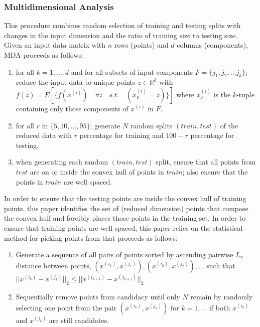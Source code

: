 \documentclass{scspaperproc}
\theoremstyle{scsthe}
\begin{document}
\subsubsection{Multidimensional Analysis}
This procedure combines random selection of training and testing
splits with changes in the input dimension and the ratio of training
size to testing size. Given an input data matrix with $n$ rows
(points) and $d$ columns (components), MDA proceeds as follows:
\begin{enumerate}
\item for all $k = 1, \ldots, d$ and for all subsets of input
  components $F = \{ j_1, j_2, \ldots j_k \}$; reduce the input data
  to unique points $z \in \mathbb{R}^k$ with $f(z) = E[ \{ f(x^{(i)})
    \quad \forall i \quad s.t. \quad (x^{(i)}_F = z) \} ]$ where
  $x^{(i)}_F$ is the $k$-tuple containing only those components of
  $x^{(i)}$ in $F$.
\item for all $r$ in $\{5, 10, \ldots, 95\}$; generate $N$ random
  splits $(train, test)$ of the reduced data with $r$ percentage for
  training and $100 - r$ percentage for testing.
\item when generating each random $(train, test)$ split, ensure that
  all points from $test$ are on or inside the convex hull of points in
  $train$; also ensure that the points in $train$ are well spaced.
\end{enumerate}

In order to ensure that the testing points are inside the convex hull
of training points, this paper identifies the set of (reduced
dimension) points that compose the convex hull and forcibly places
those points in the training set. In order to ensure that training
points are well spaced, this paper relies on the statistical method
for picking points from  that proceeds
as follows:
\begin{enumerate}
\item Generate a sequence of all pairs of points sorted by ascending
  pairwise $L_2$ distance between points, ${(x^{(i_1)},x^{(j_1)}),
    (x^{(i_2)},x^{(j_2)}), \ldots}$ such that
  $||x^{(i_k)}-x^{(j_k)}||_2 \leq ||x^{(i_{k+1})}-x^{(j_{k+1})}||_2$
\item Sequentially remove points from candidacy until only $N$ remain
  by randomly selecting one point from the pair $(x^{(i_k)},
  x^{(j_k)})$ for $k = 1,\ldots$ if both $x^{(i_k)}$ and $x^{(j_k)}$
  are still candidates.
\end{enumerate}
\end{document}
